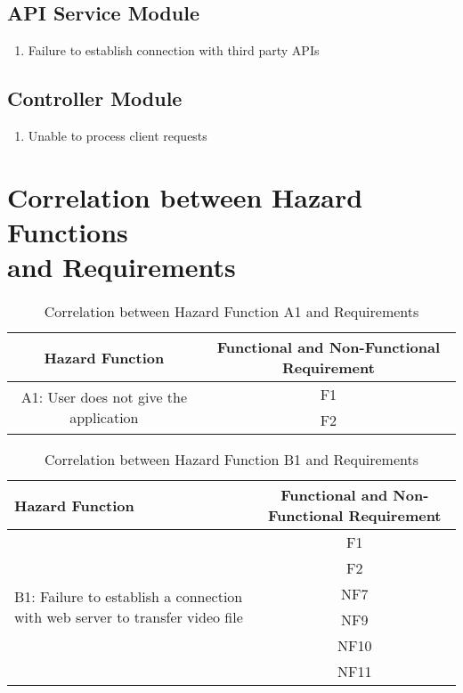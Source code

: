 \documentclass{article}
\begin{document}
\subsection{API Service Module}
\begin{enumerate}
    \item Failure to establish connection with third party APIs
\end{enumerate}

\subsection{Controller Module} 
\begin{enumerate}
    \item Unable to process client requests
\end{enumerate}

\section{Correlation between Hazard Functions\\and Requirements}
\renewcommand\thesubsection{\thesection.\arabic{subsection}}

\begin{table}[H]
    \centering
    \begin{tabular}{|c|c|} \hline
        \textbf{Hazard Function} & \textbf{Functional and Non-Functional Requirement} \\ \hline
        \multirow{2}{*}{A1: User does not give the application} & F1\\ \cline{2-2}
         & F2\\ \hline
    \end{tabular}
    \caption{Correlation between Hazard Function A1 and Requirements}
    \label{tab:A1Req}
\end{table}

\begin{table}[H]
    \centering
    \begin{tabular}{|p{}|c|} \hline
        \textbf{Hazard Function} & \textbf{Functional and Non-Functional Requirement} \\ \hline
        \multirow{6}{0.3\textwidth}{B1: Failure to establish a connection with web server to transfer video file} & F1\\ \cline{2-2}
         & F2\\ \cline{2-2}
         & NF7\\ \cline{2-2}
         & NF9\\ \cline{2-2}
         & NF10\\ \cline{2-2}
         & NF11\\ \hline
    \end{tabular}
    \caption{Correlation between Hazard Function B1 and Requirements}
    \label{tab:B1Req}
\end{table}
\end{document}
